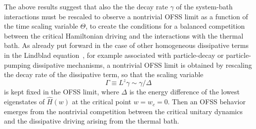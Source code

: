 The above results suggest that also the the decay rate $\gamma$ of the
system-bath interactions must be rescaled to observe a nontrivial OFSS
limit as a function of the time scaling variable $\Theta$, to create
the conditions for a balanced competition between the critical
Hamiltonian driving and the interactions with the thermal bath. As
already put forward in the case of other homogeneous dissipative terms
in the Lindblad equation~\cite{NRV-19-cd,RV-20-kz,TV-21,RV-21,FT-23},
for example associated with particle-decay or particle-pumping
dissipative mechanisms, a nontrivial OFSS limit is obtained by
rescaling the decay rate of the dissipative term, so that the scaling
variable
\begin{equation}
  \Gamma \equiv L^z \gamma \sim \gamma/\Delta
  \label{gammadef}
\end{equation}
is kept fixed in the OFSS limit, where $\Delta$ is the energy
difference of the lowest eigenstates of $\hat{H}(w)$ at the critical
point $w=w_c=0$.  Then an OFSS behavior emerges from the nontrivial
competition between the critical unitary dynamics and the dissipative
driving arising from the thermal bath.


